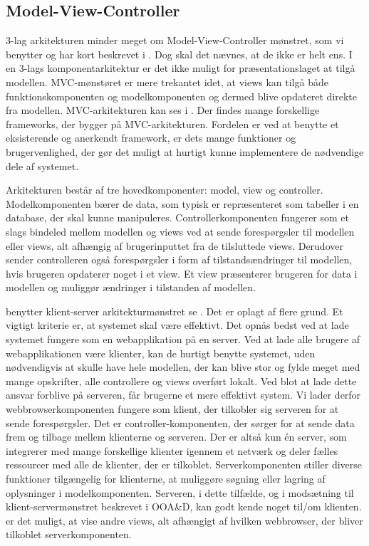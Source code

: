 \subsection{Model-View-Controller}
\label{subsec:mvc}
3-lag arkitekturen minder meget om Model-View-Controller mønstret, som vi benytter og har kort beskrevet i . Dog skal det nævnes, at de ikke er helt ens. I en 3-lags komponentarkitektur er det ikke muligt for præsentationslaget at tilgå modellen. MVC-mønstøret er mere trekantet idet, at views kan tilgå både funktionskomponenten og modelkomponenten og dermed blive opdateret direkte fra modellen\cite{designpatterns}. MVC-arkitekturen kan ses i . Der findes mange forskellige frameworks, der bygger på MVC-arkitekturen. Fordelen er ved at benytte et eksisterende og anerkendt framework, er dets mange funktioner og brugervenlighed, der gør det muligt at hurtigt kunne implementere de nødvendige dele af systemet.

Arkitekturen består af tre hovedkomponenter: model, view og controller. Modelkomponenten bærer de data, som typisk er repræsenteret som tabeller i en database, der skal kunne manipuleres. Controllerkomponenten fungerer som et slags bindeled mellem modellen og views ved at sende forespørgsler til modellen eller views, alt afhængig af brugerinputtet fra de tilsluttede views. Derudover sender controlleren også forespørgsler i form af tilstandsændringer til modellen, hvis brugeren \fx opdaterer noget i et view. Et view præsenterer brugeren for data i modellen og muliggør ændringer i tilstanden af modellen.

\Foodl{} benytter klient-server arkitekturmønstret se . Det er oplagt af flere grund. Et vigtigt kriterie er, at systemet skal være effektivt. Det opnås bedst ved at lade systemet fungere som en webapplikation på en server. Ved at lade alle brugere af webapplikationen være klienter, kan de hurtigt benytte systemet, uden nødvendigvis at skulle have hele modellen, der kan blive stor og fylde meget med mange opskrifter, alle controllere og views overført lokalt. Ved blot at lade dette ansvar forblive på serveren, får brugerne et mere effektivt system. Vi lader derfor webbrowserkomponenten fungere som klient, der tilkobler sig serveren for at sende forespørgsler. Det er controller-komponenten, der sørger for at sende data frem og tilbage mellem klienterne og serveren. Der er altså kun én server, som integrerer med mange forskellige klienter igennem et netværk og deler fælles ressourcer med alle de klienter, der er tilkoblet. Serverkomponenten stiller diverse funktioner tilgængelig for klienterne, \fx at muliggøre søgning eller lagring af oplysninger i modelkomponenten. Serveren, i dette tilfælde, og i modsætning til klient-servermønstret beskrevet i OOA\&D\cite{ooad}, kan godt kende noget til/om klienten. \Fx er det muligt, at vise andre views, alt afhængigt af hvilken webbrowser, der bliver tilkoblet serverkomponenten.

